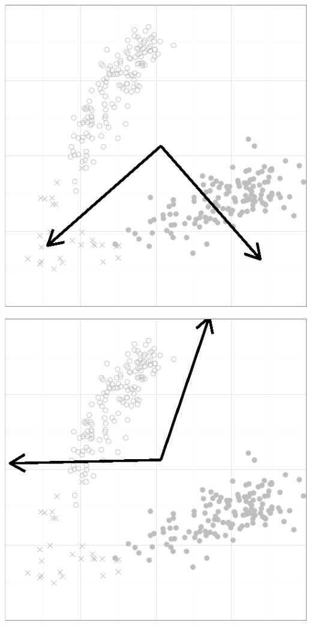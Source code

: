 \documentclass{article}\usepackage[]{graphicx}\usepackage[]{color}
\makeatletter
\def\maxwidth{ %
  \ifdim\Gin@nat@width>\linewidth
    \linewidth
  \else
    \Gin@nat@width
  \fi
}
\newenvironment{knitrout}{}{} %
\makeatother
\begin{document}
\begin{knitrout}
{\centering \includegraphics[width=\maxwidth]{figure/smallplots-1} 

}




{\centering \includegraphics[width=\maxwidth]{figure/smallplots-2} 

}
\end{knitrout}
\end{document}
